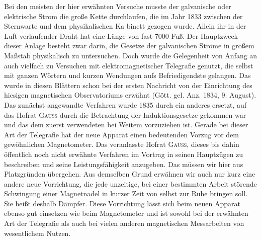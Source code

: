 Bei den meisten der hier erwähnten Versuche musste der galvanische oder elektrische Strom die große Kette durchlaufen, die im Jahr 1833 zwischen der Sternwarte und dem physikalischen Ka%
binett gezogen wurde. Allein ihr in der Luft verlaufender Draht hat eine Länge von fast 7000 Fuß. Der Hauptzweck dieser Anlage besteht zwar darin, die Gesetze der galvanischen Ströme in großem Maßstab physikalisch zu untersuchen. Doch wurde die Gelegenheit von Anfang an auch vielfach zu Versuchen mit elektromagnetischer Telegrafie genutzt, die selbst mit ganzen Wörtern und kurzen Wendungen aufs Befriedigendste gelangen. Das wurde in diesen Blättern schon bei der ersten Nachricht von der Einrichtung des hiesigen magnetischen Observatoriums erwähnt (Gött. gel. Anz. 1834, 9. August). Das zunächst angewandte Verfahren wurde 1835 durch ein anderes ersetzt, auf das Hofrat \textsc{Gauss} durch die Betrachtung der Induktionsgesetze gekommen war und das dem zuerst verwendeten bei Weitem vorzuziehen ist. Gerade bei dieser Art der Telegrafie hat der neue Apparat einen bedeutenden Vorzug vor dem gewöhnlichen Magnetometer. Das veranlasste Hofrat \textsc{Gauss}, dieses bis dahin öffentlich noch nicht erwähnte Verfahren im Vortrag in seinen Hauptzügen zu beschreiben und seine Leistungsfähigkeit anzugeben. Das müssen wir hier aus Platzgründen übergehen. Aus demselben Grund erwähnen wir auch nur kurz eine andere neue Vorrichtung, die jede unzeitige, bei einer bestimmten Arbeit störende Schwingung einer Magnetnadel in kurzer Zeit von selbst zur Ruhe bringen soll. Sie heißt deshalb Dämpfer. Diese Vorrichtung lässt sich beim neuen Apparat ebenso gut einsetzen wie beim Magnetometer und ist sowohl bei der erwähnten Art der Telegrafie als auch bei vielen anderen magnetischen Messarbeiten von wesentlichem Nutzen.


